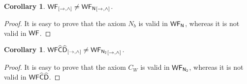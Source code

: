 \documentclass[12pt]{article}
\newtheorem{cor}[thm]{Corollary}
\begin{document}
\begin{cor}
${\sf WF}_{[\rightarrow, \wedge]}\neq {\sf WF_{N}}_{[\rightarrow, \wedge]}$.
\end{cor}
\begin{proof}
It is easy to prove that the axiom $ N_{b}$ is valid in $  {\sf WF_{N}}$, whereas it is not valid in $  {\sf WF}$.
\end{proof}


\begin{cor}
$ {\sf WF}\widehat{\sf C} \widehat{\sf D}_{[\rightarrow, \wedge]}\neq {\sf WF_{N_{2}}}_{[\rightarrow, \wedge]}$.
\end{cor}
\begin{proof}
It is easy to prove that the axiom $ C_{W}$ is valid in $  {\sf WF_{N_{2}}}$, whereas it is not valid in ${\sf WF}\widehat{\sf C} \widehat{\sf D}$.
\end{proof}

\end{document}
